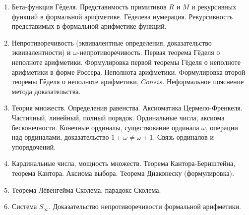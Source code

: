 \documentclass[11pt,a4paper,oneside]{scrartcl}
\begin{document}
\begin{enumerate}
\item Бета-функция Гёделя. Представимость примитивов $R$ и $M$ и рекурсивных функций в формальной арифметике.
Гёделева нумерация. Рекурсивность представимых в формальной арифметике функций.
\item Непротиворечивость (эквивалентные определения, доказательство эквивалентности) и $\omega$-не\-про\-ти\-во\-речивость. 
Первая теорема Гёделя о неполноте арифметики.
Формулировка первой теоремы Гёделя о неполноте арифметики в форме Россера. Неполнота арифметики.
Формулировка второй теоремы Гёделя о неполноте арифметики, $Consis$. 
Неформальное пояснение метода доказательства.
\item Теория множеств. Определения равенства. Аксиоматика Цермело-Френкеля. Частичный, линейный, полный порядок.
Ординальные числа, аксиома бесконечности. Конечные ординалы, существование ординала $\omega$, 
операции над ординалами, доказательство $1+\omega\ne\omega+1$. Связь ординалов и упорядочений.
\item Кардинальные числа, мощность множеств. Теорема Кантора-Бернштейна, теорема Кантора. 
Аксиома выбора. Теорема Диаконеску (формулировка).
\item Теорема Лёвенгейма-Сколема, парадокс Сколема.
\item Система $S_\infty$. Доказательство непротиворечивости формальной арифметики.
\end{enumerate}
\end{document}
